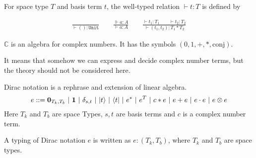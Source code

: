 
\begin{definition}
  For space type $T$ and basis term $t$, the well-typed relation $\vdash t : T$ is defined by
  
  \begin{align*}
    \frac{}{\vdash () : \texttt{Unit}}
    \qquad
    \frac{\Vdash a : A}{\vdash a : A}
    \qquad
    \frac{\vdash t_1 : T_1 \qquad \vdash t_2 : T_2}{\vdash (t_1, t_2) : T_1 * T_2}
  \end{align*}
\end{definition}

\begin{postulate}
  $\mathbb{C}$ is an algebra for complex numbers. It has the symbols $(0, 1, +, *, \textrm{conj})$.
\end{postulate}
It means that somehow we can express and decide complex number terms, but the theory should not be considered here.

\begin{definition}
  Dirac notation is a rephrase and extension of linear algebra.
  \begin{align*}
    e ::= \mathbf{0}_{T_k, T_b}\ |\ \mathbf{1}\ |\ \delta_{s, t}\ |\ \ket{t}\ |\ \bra{t}\ |\ e^*\ |\ e^T\ |\ c * e\ |\ e + e\ |\ e \cdot e\ |\ e \otimes e
  \end{align*}
  Here $T_k$ and $T_b$ are space Types, $s, t$ are basis terms and $c$ is a complex number term.
\end{definition}

\begin{definition}
  A typing of Dirac notation $e$ is written as $e : (T_k, T_b)$, where $T_k$ and $T_b$ are space types.
\end{definition}

